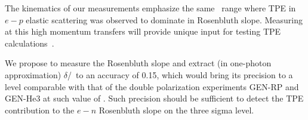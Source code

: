 The kinematics of our measurements emphasize the same \qsq~range where TPE in $e-p$ elastic scattering was observed to dominate in Rosenbluth slope.
Measuring at this high momentum transfers will provide unique input for testing TPE calculations~\cite{Blunden:2005ew}.

We propose to measure the Rosenbluth slope and extract (in one-photon approximation) $\delta$\gen/\gmn~to an accuracy of 0.15, which would bring its precision to a level comparable with that of the double polarization experiments GEN-RP and GEN-He3 at such value of \qsq.
Such precision should be sufficient to detect the TPE contribution to the $e-n$ Rosenbluth slope on the three sigma level.
